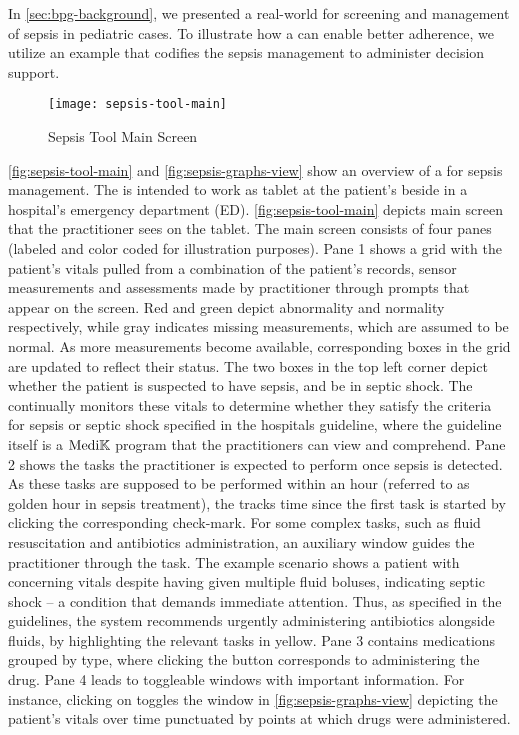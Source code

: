 In \autoref{sec:bpg-background}, we presented a real-world
\BPG{} for screening and management of sepsis in pediatric cases.
To illustrate how a \CDSSs{} can enable better \BPG{} adherence,
we utilize an example \CDSS{} that codifies the sepsis management \BPG{}
to administer decision support.

\begin{figure}[t!]
  \centering
  \texttt{[image: sepsis-tool-main]}
  \caption{Sepsis Tool Main Screen}\label{fig:sepsis-tool-main}
\end{figure}

\autoref{fig:sepsis-tool-main} and \autoref{fig:sepsis-graphs-view} show an overview
of a \CDSS{} for sepsis management.
The \CDSS{} is intended to work as tablet at
the patient's beside in a hospital's emergency department (ED).
\autoref{fig:sepsis-tool-main} depicts main screen that the practitioner sees on the tablet.
The main screen consists of four panes (labeled and color coded for illustration
purposes). Pane 1 shows a grid with the patient's vitals pulled
from a combination of the patient's records, sensor measurements and
assessments made by practitioner through prompts that appear on the screen.
Red and green depict abnormality and normality respectively, while gray
indicates missing measurements, which are assumed to be normal. As more
measurements become available, corresponding boxes in the grid are updated
to reflect their status. The two boxes in the top left corner depict whether
the patient is suspected to have sepsis, and be in septic shock. The \CDSS{}
continually monitors these vitals to determine whether they satisfy the criteria
for sepsis or septic shock specified in the hospitals guideline, where the
guideline itself is a $\text{Medi}\mathbb{K}{}{}$ program that the practitioners can view and
comprehend. Pane 2 shows the tasks the practitioner is expected to perform
once sepsis is detected. As these tasks are supposed to be performed within an
hour (referred to as golden hour in sepsis treatment), the \CDSS{} tracks time
since the first task is started by clicking the corresponding check-mark.
For some complex tasks, such as fluid resuscitation and antibiotics
administration, an auxiliary window guides the practitioner through the task. The
example scenario shows a patient with concerning vitals despite having
given multiple fluid boluses, indicating septic shock -- a condition that
demands immediate attention. Thus, as specified in the guidelines, the system
recommends urgently administering antibiotics alongside fluids, by highlighting
the relevant tasks in yellow.
Pane 3 contains medications grouped by type, where clicking the
 button corresponds to administering the drug.
Pane 4 leads to toggleable windows with
important information. For instance, clicking on 
toggles the window in \autoref{fig:sepsis-graphs-view} depicting
the patient's vitals over time punctuated by points at which
drugs were administered.


